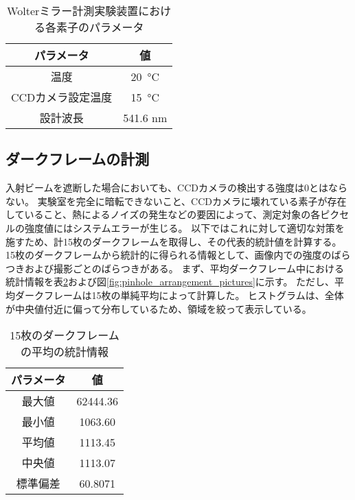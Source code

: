 \begin{table}[!ht]
\begin{center}
  \begin{tabular}{|c|c|} \hline
    パラメータ & 値 \\ \hline
    温度 & \SI{20}{\degreeCelsius}  \\
    CCDカメラ設定温度 & \SI{15}{\degreeCelsius} \\
    設計波長 & 541.6 nm \\ \hline
  \end{tabular}
  \caption{Wolterミラー計測実験装置における各素子のパラメータ}
  \label{tb:mirror_experiment_params}
\end{center}
\end{table}


\subsection{ダークフレームの計測}
\label{chap5_darkflame_measurement}

入射ビームを遮断した場合においても、CCDカメラの検出する強度は0とはならない。
実験室を完全に暗転できないこと、CCDカメラに壊れている素子が存在していること、熱によるノイズの発生などの要因によって、測定対象の各ピクセルの強度値にはシステムエラーが生じる。
以下ではこれに対して適切な対策を施すため、計15枚のダークフレームを取得し、その代表的統計値を計算する。
15枚のダークフレームから統計的に得られる情報として、画像内での強度のばらつきおよび撮影ごとのばらつきがある。
まず、平均ダークフレーム中における統計情報を表\ref{tb:darkflame_average_data}および図\ref{fig:pinhole_arrangement_pictures}に示す。
ただし、平均ダークフレームは15枚の単純平均によって計算した。
ヒストグラムは、全体が中央値付近に偏って分布しているため、領域を絞って表示している。

\begin{table}[!ht]
\begin{center}
  \begin{tabular}{|c|c|} \hline
    パラメータ & 値 \\ \hline
    最大値 & 62444.36 \\
    最小値 & 1063.60 \\
    平均値 & 1113.45 \\
    中央値 & 1113.07 \\
    標準偏差 & 60.8071 \\ \hline
  \end{tabular}
  \caption{15枚のダークフレームの平均の統計情報}
  \label{tb:darkflame_average_data}
\end{center}
\end{table}

